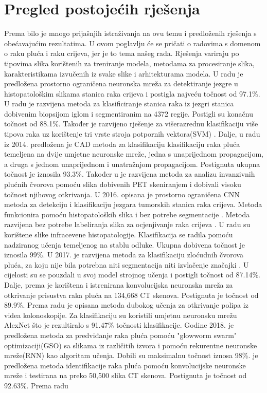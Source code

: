 \documentclass[conference, utf8]{IEEEtran}
\begin{document}
	\section{Pregled postojećih rješenja}
	Prema \cite{mehmood2022malignancy} bilo je mnogo prijašnjih istraživanja na ovu temu i predloženih rješenja s obećavajućim rezultatima. U ovom poglavlju će se pričati o radovima s domenom o raku pluća i raku crijeva, jer je to tema našeg rada. Rješenja variraju po tipovima slika korištenih za treniranje modela, metodama za procesiranje slika, karakteristikama izvučenih iz svake slike i arhitekturama modela. U radu \cite{Sirinukunwattana} je predložena prostorno ograničena neuronska mreža za detektiranje jezgre u histopatološkim slikama stanica raka crijeva i postigla najveću točnost od 97.1\%. U radu \cite{Multimodal_sparse} je razvijena metoda za klasificiranje stanica raka iz jezgri stanica dobivenim biopsijom iglom i segmentiranim na 4372 regije. Postigli su konačnu točnost od 88.1\%. Također je razvijeno rješenje za višerazrednu klasifikaciju više tipova raka uz korištenje tri vrste stroja potpornih vektora(SVM) \cite{xu2013multi}. Dalje, u radu iz 2014.\cite{kuruvilla2014lung} predložena je CAD metoda za klasifikaciju klasifikaciju raka pluća temeljena na dvije umjetne neuronske mreže, jedna s unaprijednom propagacijom, a druga s jednom unaprijednom i unatražnjom propagacijom. Postignuta ukupna točnost je iznosila 93.3\%. Također u \cite{deppen2014accuracy} je razvijena metoda za analizu invanzivnih plućnih čvorova pomoću slika dobivenih PET skeniranjem i dobivali visoku točnost njihovog otkrivanja. U 2016. opisana je prostorno ograničena CNN metoda za detekciju i klasifikaciju jezgara tumorskih stanica raka crijeva. Metoda funkcionira pomoću histopatoloških slika i bez potrebe segmentacije \cite{sirinukunwattana2016locality}. Metoda razvijena bez potrebe labeliranja slika za ocjenjivanje raka crijeva \cite{kuepper2016label}. U radu su korištene slike infracevene histopatologije. Klasifikacija se radila pomoću nadziranog učenja temeljenog na stablu odluke. Ukupna dobivena točnost je iznosila 99\%. U 2017. je razvijena metoda za klasifikaciju zloćudnih čvorova pluća, za koju nije bila potrebna niti segmentacija niti izvlačenje značajki \cite{shen2017multi}. U cijelosti su se pouzdali u svoj model strojnog učenja i postigli točnost od 87.14\%. Dalje, prema \cite{sun2017automatic} je korištena i istrenirana konvolucijska neuronska mreža za otkrivanje prisustva raka pluća na 134,668 CT skenova. Postignuta je točnost od 89.9\%. Prema radu \cite{yuan2017automatic} je opisana metoda dubokog učenja za otkrivanje polipa iz videa kolonoskopije. Za klasifikaciju su koristili umjetnu neuronsku mrežu AlexNet što je rezultiralo s 91.47\% točnosti klasifikacije. Godine 2018. je predložena metoda za predviđanje raka pluća \cite{selvanambi2020lung} pomoću "glowworm swarm" optimizaciji(GSO) sa slikama iz različitih izvora i pomoću rekurentne neuronske mreže(RNN) kao algoritam učenja. Dobili su maksimalnu točnost iznosa 98\%. \cite{de2018classification} je predložena metoda identifikacije raka pluća pomoću konvolucijske neuronske mreže i testirana na preko 50,500 slika CT skenova. Postignuta je točnost od 92.63\%. Prema radu \cite{da2020lung} 
\end{document}
